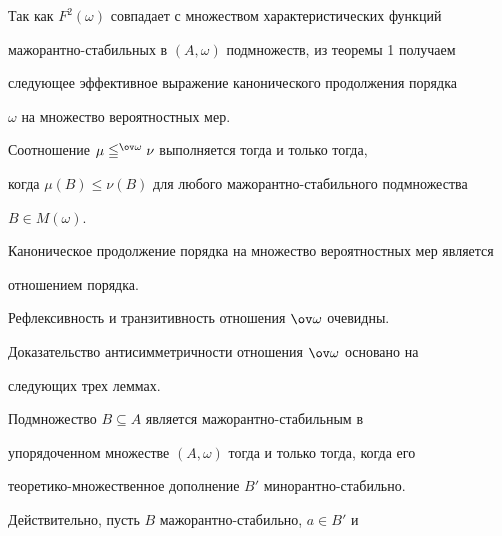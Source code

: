  


Так как $F^2(\omega)$ совпадает с множеством характеристических функций 


мажорантно-ста\-биль\-ных в $(A,\omega)$ подмножеств, из теоремы 1 получаем 


следующее эффективное выражение канонического продолжения порядка 


$\omega$ на множество вероятностных мер. 


 


\begin{cornonum} 


Соотношение $\mu\leqq^{\ov\omega}\nu$ выполняется тогда и только тогда, 


когда $\mu(B)\le\nu(B)$ для любого мажорантно-стабильного подмножества 


$B\in M(\omega)$. 


\end{cornonum} 


 


\begin{thm} 


Каноническое продолжение порядка на множество вероятностных мер является 


отношением порядка. 


\end{thm} 


 


Рефлексивность и транзитивность отношения $\ov\omega$ очевидны. 


Доказательство антисимметричности отношения $\ov\omega$ основано на 


следующих трех леммах. 


 


\begin{lem} 


Подмножество $B\subseteq A$ является мажорантно-стабильным в 


упорядоченном множестве $(A,\omega)$ тогда и только тогда, когда его 


теоретико-множественное дополнение $B'$ минорантно-стабильно. 


\end{lem} 


 


Действительно, пусть $B$ мажорантно-стабильно, $a\in B'$ и 



